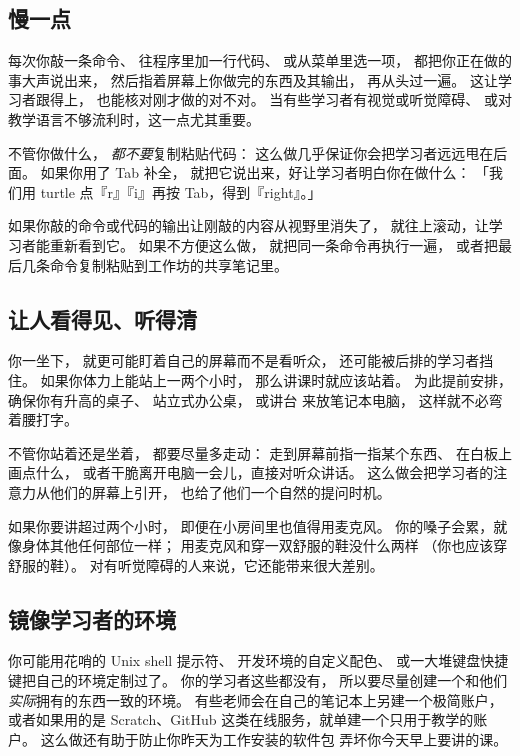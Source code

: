 \subsection*{慢一点}

每次你敲一条命令、
往程序里加一行代码、
或从菜单里选一项，
都把你正在做的事大声说出来，
然后指着屏幕上你做完的东西及其输出，
再从头过一遍。
这让学习者跟得上，
也能核对刚才做的对不对。
当有些学习者有视觉或听觉障碍、
或对教学语言不够流利时，这一点尤其重要。

不管你做什么，
\emph{都不要}复制粘贴代码：
这么做几乎保证你会把学习者远远甩在后面。
如果你用了 Tab 补全，
就把它说出来，好让学习者明白你在做什么：
「我们用 turtle 点『r』『i』再按 Tab，得到『right』。」

如果你敲的命令或代码的输出让刚敲的内容从视野里消失了，
就往上滚动，让学习者能重新看到它。
如果不方便这么做，
就把同一条命令再执行一遍，
或者把最后几条命令复制粘贴到工作坊的共享笔记里。

\subsection*{让人看得见、听得清}

你一坐下，
就更可能盯着自己的屏幕而不是看听众，
还可能被后排的学习者挡住。
如果你体力上能站上一两个小时，
那么讲课时就应该站着。
为此提前安排，确保你有升高的桌子、
站立式办公桌，
或讲台
来放笔记本电脑，
这样就不必弯着腰打字。

不管你站着还是坐着，
都要尽量多走动：
走到屏幕前指一指某个东西、
在白板上画点什么，
或者干脆离开电脑一会儿，直接对听众讲话。
这么做会把学习者的注意力从他们的屏幕上引开，
也给了他们一个自然的提问时机。

如果你要讲超过两个小时，
即便在小房间里也值得用麦克风。
你的嗓子会累，就像身体其他任何部位一样；
用麦克风和穿一双舒服的鞋没什么两样
（你也应该穿舒服的鞋）。
对有听觉障碍的人来说，它还能带来很大差别。

\subsection*{镜像学习者的环境}

你可能用花哨的 Unix shell 提示符、
开发环境的自定义配色、
或一大堆键盘快捷键把自己的环境定制过了。
你的学习者这些都没有，
所以要尽量创建一个和他们\emph{实际}拥有的东西一致的环境。
有些老师会在自己的笔记本上另建一个极简账户，
或者如果用的是 Scratch、GitHub 这类在线服务，就单建一个只用于教学的账户。
这么做还有助于防止你昨天为工作安装的软件包
弄坏你今天早上要讲的课。

